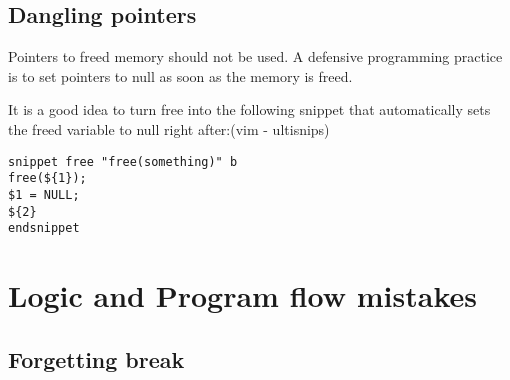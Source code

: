 \subsection{Dangling pointers}\label{dangling-pointers}

\begin{Shaded}
\begin{Highlighting}[]
   \NormalTok{);}
  \NormalTok{);}
  \NormalTok{); }
\end{Highlighting}
\end{Shaded}

Pointers to freed memory should not be used. A defensive programming
practice is to set pointers to null as soon as the memory is freed.

It is a good idea to turn free into the following snippet that
automatically sets the freed variable to null right after:(vim -
ultisnips)

\begin{verbatim}
snippet free "free(something)" b
free(${1});
$1 = NULL;
${2}
endsnippet
\end{verbatim}

\section{Logic and Program flow
mistakes}\label{logic-and-program-flow-mistakes}

\subsection{Forgetting break}\label{forgetting-break}

\begin{Shaded}
\begin{Highlighting}[]
 \NormalTok{; }
   \NormalTok{);}
   \NormalTok{);}
   \NormalTok{);}
\NormalTok{\}}
\end{Highlighting}
\end{Shaded}

